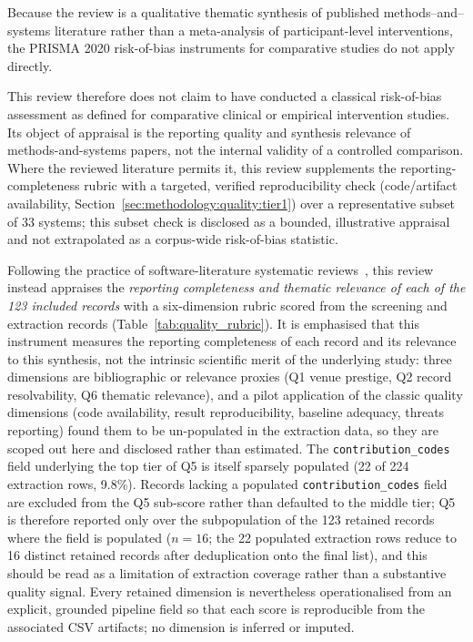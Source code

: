 Because the review is a qualitative thematic synthesis of published
methods--and--systems literature rather than a meta-analysis of participant-level
interventions, the PRISMA 2020 risk-of-bias instruments for comparative studies do
not apply directly.

This review therefore does not claim to have conducted a classical risk-of-bias
assessment as defined for comparative clinical or empirical intervention studies.
Its object of appraisal is the reporting quality and synthesis relevance of
methods-and-systems papers, not the internal validity of a controlled comparison.
Where the reviewed literature permits it, this review supplements the
reporting-completeness rubric with a targeted, verified reproducibility check
(code/artifact availability, Section~\ref{sec:methodology:quality:tier1}) over a
representative subset of 33 systems; this subset check is disclosed as a bounded,
illustrative appraisal and not extrapolated as a corpus-wide risk-of-bias
statistic.

Following the practice of software-literature systematic
reviews~\cite{XiaoWatson2019}, this review instead appraises the \emph{reporting
completeness and thematic relevance of each of the 123 included records} with a
six-dimension rubric scored
from the screening and extraction records (Table~\ref{tab:quality_rubric}). It is
emphasised that this instrument measures the reporting completeness of each record
and its relevance to this synthesis, not the intrinsic scientific merit of the
underlying study: three dimensions are bibliographic or relevance proxies (Q1
venue prestige, Q2 record resolvability, Q6 thematic relevance), and a pilot
application of the classic quality dimensions (code availability, result
reproducibility, baseline adequacy, threats reporting) found them to be
un-populated in the extraction data, so they are scoped out here and disclosed
rather than estimated. The \texttt{contribution\_codes} field underlying the top
tier of Q5 is itself sparsely populated (22 of 224 extraction rows, 9.8\%). Records
lacking a populated \texttt{contribution\_codes} field are excluded from the Q5
sub-score rather than defaulted to the middle tier; Q5 is therefore reported only
over the subpopulation of the 123 retained records where the field is populated
($n=16$; the 22 populated extraction rows reduce to 16 distinct retained records
after deduplication onto the final list), and this should be read as a limitation
of extraction coverage rather than a substantive quality signal. Every retained
dimension is nevertheless operationalised from an explicit, grounded pipeline field
so that each score is reproducible from the associated CSV artifacts; no dimension
is inferred or imputed.

